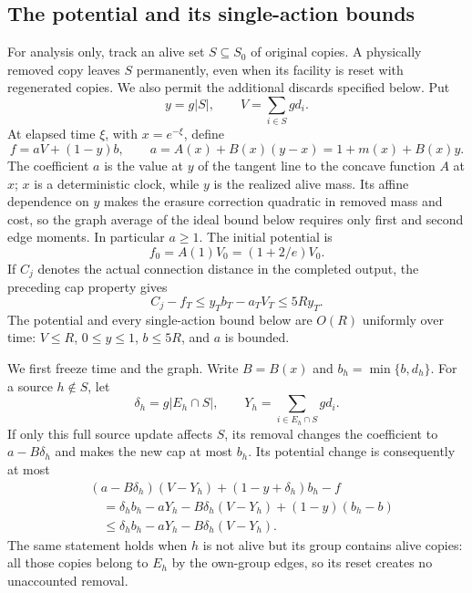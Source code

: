 \subsection{The potential and its single-action bounds}

For analysis only, track an alive set $S\subseteq S_0$ of original
copies.  A physically removed copy leaves $S$ permanently, even when
its facility is reset with regenerated copies.  We also permit the
additional discards specified below.  Put
\[
 y=g|S|,\qquad V=\sum_{i\in S}gd_i.
\]
At elapsed time $\xi$, with $x=e^{-\xi}$, define
\begin{equation}\label{eq:rnd-potential}
 f=aV+(1-y)b,
 \qquad
 a=A(x)+B(x)(y-x)=1+m(x)+B(x)y.
\end{equation}
The coefficient $a$ is the value at $y$ of the tangent line to the
concave function $A$ at $x$; $x$ is a deterministic clock, while $y$
is the realized alive mass. Its affine dependence on $y$ makes the
erasure correction quadratic in removed mass and cost, so the graph
average of the ideal bound below requires only first and second edge
moments.
In particular $a\ge1$.  The initial potential is
\begin{equation}\label{eq:rnd-initial-potential}
 f_0=A(1)V_0=(1+2/e)V_0.
\end{equation}
If $C_j$ denotes the actual connection distance in the completed
output, the preceding cap property gives
\begin{equation}\label{eq:rnd-terminal-correction}
 C_j-f_T\le y_Tb_T-a_TV_T\le5Ry_T.
\end{equation}
The potential and every single-action bound below are $O(R)$ uniformly
over time: $V\le R$, $0\le y\le1$, $b\le5R$, and $a$ is bounded.

We first freeze time and the graph.  Write $B=B(x)$ and
$b_h=\min\{b,d_h\}$.  For a source $h\notin S$, let
\[
 \delta_h=g|E_h\cap S|,
 \qquad Y_h=\sum_{i\in E_h\cap S}gd_i.
\]
If only this full source update affects $S$, its removal changes the
coefficient to $a-B\delta_h$ and makes the new cap at most $b_h$.
Its potential change is consequently at most
\begin{align*}
 &(a-B\delta_h)(V-Y_h)+(1-y+\delta_h)b_h-f\\
 &\quad=\delta_hb_h-aY_h-B\delta_h(V-Y_h)
          +(1-y)(b_h-b)\\
 &\quad\le\delta_hb_h-aY_h-B\delta_h(V-Y_h).
\end{align*}
The same statement holds when $h$ is not alive but its group contains
alive copies: all those copies belong to $E_h$ by the own-group edges,
so its reset creates no unaccounted removal.

